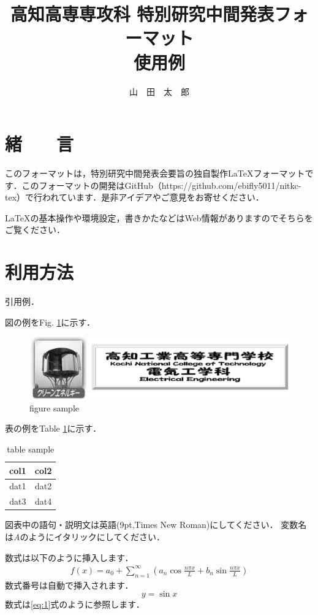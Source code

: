 \documentclass{jsarticle}
\title{高知高専専攻科 特別研究中間発表フォーマット\\使用例}
\author{山　田　太　郎}
\begin{document}
\maketitle


\section{緒　　言}
このフォーマットは，特別研究中間発表会要旨の独自製作{\LaTeX}フォーマットです．このフォーマットの開発はGitHub（https://github.com/ebifly5011/nitkc-tex）で行われています．是非アイデアやご意見をお寄せください．

{\LaTeX}の基本操作や環境設定，書きかたなどはWeb情報がありますのでそちらをご覧ください．

\section{利用方法}
引用例．

図の例をFig. \ref{fig:sample}に示す．

\begin{figure}[htbp]
\centering
\includegraphics[width=\columnwidth]{KNCT-EE.eps}
\caption{figure sample}
\label{fig:sample}
\end{figure}

表の例をTable \ref{tab:sample}に示す．

\begin{table}[htbp]
\centering
\caption{table sample}
\label{tab:sample}
\begin{tabular}{c|c}
\hline \hline
col1 & col2 \\
\hline
dat1 & dat2 \\
dat3 & dat4 \\
\hline \hline
\end{tabular}
\end{table}

図表中の語句・説明文は英語(9pt,Times New Roman)にしてください．
変数名は{\itshape A}のようにイタリックにしてください．

数式は以下のように挿入します．
\begin{eqnarray}
f(x)=a_0+\sum_{n=1}^\infty (a_n\cos\frac{n\pi x}{L}+b_n\sin\frac{n\pi x}{L})
\end{eqnarray}
数式番号は自動で挿入されます．
\begin{equation}
    y = \sin x  \label{eq:1}
\end{equation}
数式は\eqref{eq:1}式のように参照します．
\end{document}
